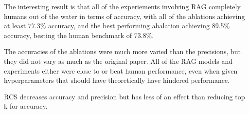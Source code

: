 The interesting result is that all of the experiements involving RAG completely humans out of the water in terms of accuracy, with all of the ablations achieving at least 77.3\% accuracy, and the best performing abalation achieving 89.5\% accuracy, besting the human benchmark of 73.8\%. 

The accuracies of the ablations were much more varied than the precisions, but they did not vary as much as the original paper. All of the RAG models and experiments either were close to or beat human performance, even when given hyperparameters that should have theoretically have hindered performance. 







RCS decreases accuracy and precision but has less of an effect than reducing top k for accuracy. 





